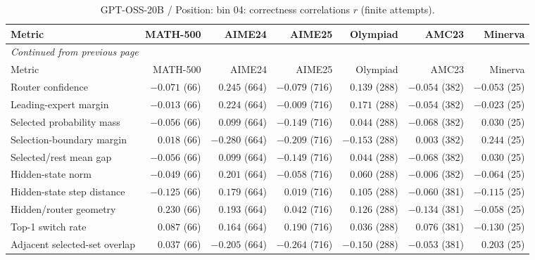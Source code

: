 \begingroup\scriptsize\setlength{\tabcolsep}{4pt}
\begin{longtable}{@{}lrrrrrr@{}}
\caption{GPT-OSS-20B / Position: bin 04: correctness correlations $r$ (finite attempts).}\label{tab:multi-gptoss-position-bin_04}\\
\toprule
Metric & MATH-500 & AIME24 & AIME25 & Olympiad & AMC23 & Minerva \\
\midrule\endfirsthead
\multicolumn{7}{l}{\textit{Continued from previous page}}\\
\toprule
Metric & MATH-500 & AIME24 & AIME25 & Olympiad & AMC23 & Minerva \\
\midrule\endhead
\bottomrule\endfoot
Router confidence & $-0.071$ (66) & $0.245$ (664) & $-0.079$ (716) & $0.139$ (288) & $-0.054$ (382) & $-0.053$ (25) \\
Leading-expert margin & $-0.013$ (66) & $0.224$ (664) & $-0.009$ (716) & $0.171$ (288) & $-0.054$ (382) & $-0.023$ (25) \\
Selected probability mass & $-0.056$ (66) & $0.099$ (664) & $-0.149$ (716) & $0.044$ (288) & $-0.068$ (382) & $0.030$ (25) \\
Selection-boundary margin & $0.018$ (66) & $-0.280$ (664) & $-0.209$ (716) & $-0.153$ (288) & $0.003$ (382) & $0.244$ (25) \\
Selected/rest mean gap & $-0.056$ (66) & $0.099$ (664) & $-0.149$ (716) & $0.044$ (288) & $-0.068$ (382) & $0.030$ (25) \\
Hidden-state norm & $-0.049$ (66) & $0.201$ (664) & $-0.058$ (716) & $0.060$ (288) & $-0.006$ (382) & $-0.064$ (25) \\
Hidden-state step distance & $-0.125$ (66) & $0.179$ (664) & $0.019$ (716) & $0.105$ (288) & $-0.060$ (381) & $-0.115$ (25) \\
Hidden/router geometry & $0.230$ (66) & $0.193$ (664) & $0.042$ (716) & $0.126$ (288) & $-0.134$ (381) & $-0.058$ (25) \\
Top-1 switch rate & $0.087$ (66) & $0.164$ (664) & $0.190$ (716) & $0.036$ (288) & $0.076$ (381) & $-0.130$ (25) \\
Adjacent selected-set overlap & $0.037$ (66) & $-0.205$ (664) & $-0.264$ (716) & $-0.150$ (288) & $-0.053$ (381) & $0.203$ (25) \\
\end{longtable}\endgroup

